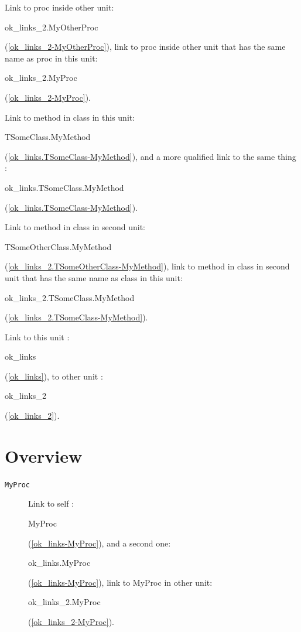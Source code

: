 \documentclass{report}
\begin{document}
Link to proc inside other unit: \begin{ttfamily}ok{\_}links{\_}2.MyOtherProc\end{ttfamily}(\ref{ok_links_2-MyOtherProc}), link to proc inside other unit that has the same name as proc in this unit: \begin{ttfamily}ok{\_}links{\_}2.MyProc\end{ttfamily}(\ref{ok_links_2-MyProc}).

Link to method in class in this unit: \begin{ttfamily}TSomeClass.MyMethod\end{ttfamily}(\ref{ok_links.TSomeClass-MyMethod}), and a more qualified link to the same thing : \begin{ttfamily}ok{\_}links.TSomeClass.MyMethod\end{ttfamily}(\ref{ok_links.TSomeClass-MyMethod}).

Link to method in class in second unit: \begin{ttfamily}TSomeOtherClass.MyMethod\end{ttfamily}(\ref{ok_links_2.TSomeOtherClass-MyMethod}), link to method in class in second unit that has the same name as class in this unit: \begin{ttfamily}ok{\_}links{\_}2.TSomeClass.MyMethod\end{ttfamily}(\ref{ok_links_2.TSomeClass-MyMethod}).

Link to this unit : \begin{ttfamily}ok{\_}links\end{ttfamily}(\ref{ok_links}), to other unit : \begin{ttfamily}ok{\_}links{\_}2\end{ttfamily}(\ref{ok_links_2}).
\section{Overview}
\begin{description}
\item[\texttt{\begin{ttfamily}TSomeClass\end{ttfamily} Class}]
\end{description}
\begin{description}
\item[\texttt{MyProc}]Link to self : \begin{ttfamily}MyProc\end{ttfamily}(\ref{ok_links-MyProc}), and a second one: \begin{ttfamily}ok{\_}links.MyProc\end{ttfamily}(\ref{ok_links-MyProc}), link to MyProc in other unit: \begin{ttfamily}ok{\_}links{\_}2.MyProc\end{ttfamily}(\ref{ok_links_2-MyProc}).
\end{description}
\end{document}
